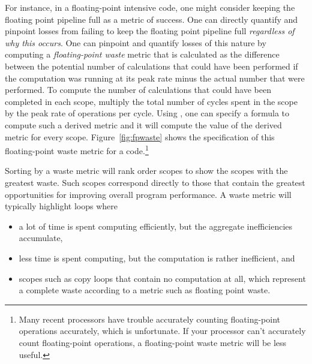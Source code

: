 \documentclass[11pt,twoside,letterpaper]{report}
\begin{document}
For instance, in a floating-point intensive code, one might consider keeping the floating point pipeline full as a metric of success.
One can directly quantify and pinpoint losses from failing to keep the floating point pipeline full {\em regardless of why this occurs}.
One can pinpoint and quantify losses of this nature by computing a {\em floating-point waste} metric that is calculated as the difference between the potential number of calculations that could have been performed if the computation was running at its peak rate minus the actual number that were performed.
To compute the number of calculations that could have been completed in each scope, multiply the total number of cycles spent in the scope by the peak rate of operations per cycle.
Using \hpcviewer{}, one can specify a formula to compute such a derived metric and it will compute the value of the derived metric for every scope.
Figure~\ref{fig:fpwaste} shows the specification of this floating-point waste metric for a code.\footnote{Many recent processors have trouble accurately counting floating-point operations accurately, which is unfortunate. If your processor can't accurately count floating-point operations, a floating-point waste metric will be less useful.}

Sorting by a waste metric will rank order scopes to show the scopes with the greatest waste.
Such scopes correspond directly to those that contain the greatest opportunities for improving overall program performance.
A waste metric will typically highlight loops where
\begin{itemize}
\item a lot of time is spent computing efficiently, but the aggregate inefficiencies accumulate,
\item less time is spent computing, but the computation is rather inefficient, and
\item scopes such as copy loops that contain no computation at all, which represent a complete waste according to a metric such as floating point waste.
\end{itemize}
\end{document}
